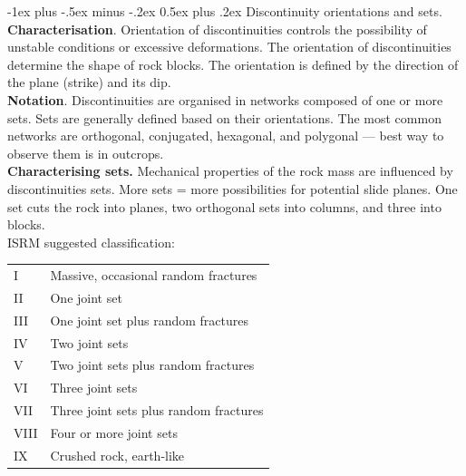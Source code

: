 \documentclass[10pt,landscape,a4paper]{article}
\makeatletter
\renewcommand{\section}{\@startsection{section}{1}{0mm}%
	{-1ex plus -.5ex minus -.2ex}%
	{0.5ex plus .2ex}%
	{\normalfont\large\bfseries}}
\makeatother
\begin{document}
\begin{multicols}{3}
		\section{Discontinuity orientations and sets.}
		\textbf{Characterisation}.
		Orientation of discontinuities controls the possibility of unstable conditions or excessive deformations.
		The orientation of discontinuities determine the shape of rock blocks.
		The orientation is defined by the direction of the plane (strike) and its dip.\\
		\textbf{Notation}.
		Discontinuities are organised in networks composed of one or more sets.
		Sets are generally defined based on their orientations.
		The most common networks are orthogonal, conjugated, hexagonal, and polygonal --- best way to observe them is in outcrops.\\
		\textbf{Characterising sets.}
		Mechanical properties of the rock mass are influenced by discontinuities sets. More sets = more possibilities for potential slide planes.
		One set cuts the rock into planes, two orthogonal sets into columns, and three into blocks.\\
		ISRM suggested classification:
			\begin{table}[H]\scriptsize\centering\begin{tabular}{ll}
				I & Massive, occasional random fractures\\
				II & One joint set\\
				III & One joint set plus random fractures\\
				IV & Two joint sets\\
				V & Two joint sets plus random fractures\\
				VI & Three joint sets\\
				VII & Three joint sets plus random fractures\\
				VIII & Four or more joint sets\\
				IX & Crushed rock, earth-like\\
			\end{tabular}\end{table}
		

\end{multicols}
\end{document}
